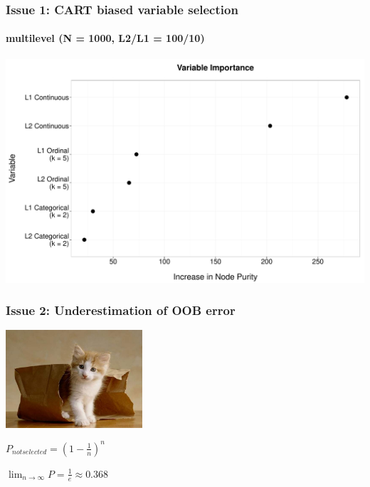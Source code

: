 \documentclass{beamer}\usepackage[]{graphicx}\usepackage[]{color}
\makeatletter
\def\maxwidth{ %
  \ifdim\Gin@nat@width>\linewidth
    \linewidth
  \else
    \Gin@nat@width
  \fi
}
\newenvironment{knitrout}{}{} %
\makeatother
\begin{document}

\begin{frame}
\frametitle{Issue 1: CART biased variable selection}
\framesubtitle{multilevel (N = 1000, L2/L1 = 100/10)}

\begin{knitrout}
\color{fgcolor}
\includegraphics[width=\maxwidth]{figure/bias_importance_lev2-1} 

\end{knitrout}

\end{frame}


\begin{frame}
\frametitle{Issue 2: Underestimation of OOB error}

\begin{multicols}{2}

\begin{center}
\includegraphics[width = 2in]{figure/oob.jpg}
\end{center}

\columnbreak

\begin{center}

$P_{notselected} = (1 - \frac{1}{n})^n$

\vspace{3ex}

$\lim_{n\to\infty} P = \frac{1}{e} \approx 0.368$

\end{center}

\end{multicols}

\end{frame}
\end{document}
